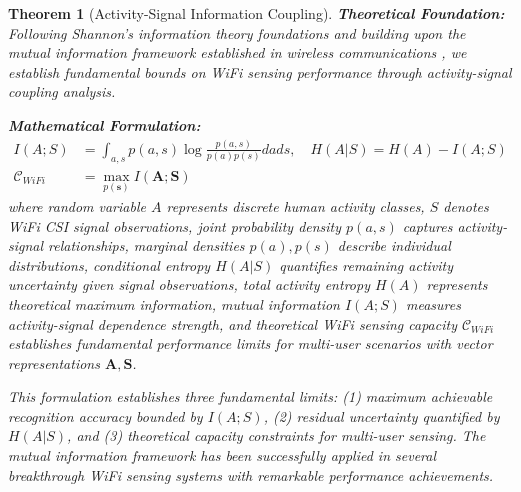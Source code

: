 \documentclass[journal]{IEEEtran}
\newtheorem{theorem}{Theorem}
\begin{document}
\begin{theorem}[Activity-Signal Information Coupling]
\label{thm:information_coupling}
\textbf{Theoretical Foundation:} Following Shannon's information theory foundations and building upon the mutual information framework established in wireless communications \cite{cover1999elements}, we establish fundamental bounds on WiFi sensing performance through activity-signal coupling analysis.

\textbf{Mathematical Formulation:}
\begin{align}
I(A;S) &= \int_{a,s} p(a,s) \log \frac{p(a,s)}{p(a)p(s)} da ds, \quad H(A|S) = H(A) - I(A;S) \label{eq:mutual_info} \\
\mathcal{C}_{WiFi} &= \max_{p(\mathbf{s})} I(\mathbf{A};\mathbf{S}) \label{eq:channel_capacity}
\end{align}
where random variable $A$ represents discrete human activity classes, $S$ denotes WiFi CSI signal observations, joint probability density $p(a,s)$ captures activity-signal relationships, marginal densities $p(a), p(s)$ describe individual distributions, conditional entropy $H(A|S)$ quantifies remaining activity uncertainty given signal observations, total activity entropy $H(A)$ represents theoretical maximum information, mutual information $I(A;S)$ measures activity-signal dependence strength, and theoretical WiFi sensing capacity $\mathcal{C}_{WiFi}$ establishes fundamental performance limits for multi-user scenarios with vector representations $\mathbf{A}, \mathbf{S}$.

This formulation establishes three fundamental limits: (1) maximum achievable recognition accuracy bounded by $I(A;S)$, (2) residual uncertainty quantified by $H(A|S)$, and (3) theoretical capacity constraints for multi-user sensing. The mutual information framework has been successfully applied in several breakthrough WiFi sensing systems with remarkable performance achievements.


\end{theorem}
\end{document}
